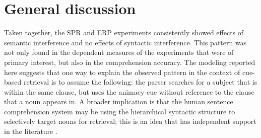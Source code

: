 \documentclass[a4paper, man, floatsintext]{apa7}
\begin{document}

\section{General discussion}

Taken together, the SPR and ERP experiments consistently showed effects of semantic interference and no effects of syntactic interference. This pattern was not only found in the dependent measures of the experiments that were of primary interest, but also in the comprehension accuracy. 
The modeling reported here suggests that one way to explain the observed pattern in the context of cue-based retrieval is to assume the following: the parser searches for a subject that is within the same clause, but uses the animacy cue without reference to the clause that a noun appears in. A broader implication is that the human sentence comprehension system may be using the hierarchical syntactic structure to selectively target nouns for retrieval; this is an idea that has independent support in the literature \citep[e.g.,][]{Sturt2003,dillon2013}.

\end{document}
